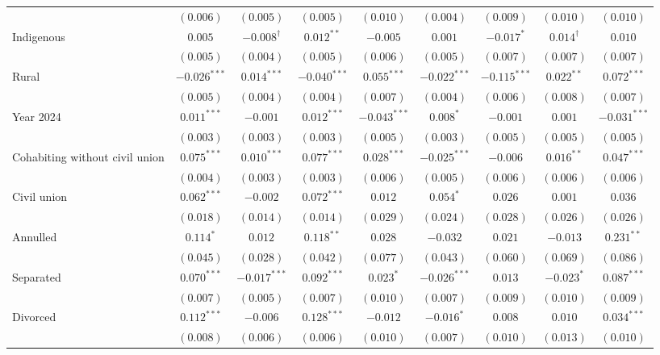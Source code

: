 \begin{table}[htpb]
\begin{adjustbox}{max totalsize={\textwidth}{0.76\textheight},center}
\begin{tabular}{l c c c c c c c c}
 & $(0.006)$ & $(0.005)$ & $(0.005)$ & $(0.010)$ & $(0.004)$ & $(0.009)$ & $(0.010)$ & $(0.010)$ \\
Indigenous & ${0.005}$ & ${-0.008}^{\dagger}$ & ${0.012}^{**}$ & ${-0.005}$ & ${0.001}$ & ${-0.017}^{*}$ & ${0.014}^{\dagger}$ & ${0.010}$ \\
 & $(0.005)$ & $(0.004)$ & $(0.005)$ & $(0.006)$ & $(0.005)$ & $(0.007)$ & $(0.007)$ & $(0.007)$ \\
Rural & ${-0.026}^{***}$ & ${0.014}^{***}$ & ${-0.040}^{***}$ & ${0.055}^{***}$ & ${-0.022}^{***}$ & ${-0.115}^{***}$ & ${0.022}^{**}$ & ${0.072}^{***}$ \\
 & $(0.005)$ & $(0.004)$ & $(0.004)$ & $(0.007)$ & $(0.004)$ & $(0.006)$ & $(0.008)$ & $(0.007)$ \\
Year 2024 & ${0.011}^{***}$ & ${-0.001}$ & ${0.012}^{***}$ & ${-0.043}^{***}$ & ${0.008}^{*}$ & ${-0.001}$ & ${0.001}$ & ${-0.031}^{***}$ \\
 & $(0.003)$ & $(0.003)$ & $(0.003)$ & $(0.005)$ & $(0.003)$ & $(0.005)$ & $(0.005)$ & $(0.005)$ \\
Cohabiting without civil union & ${0.075}^{***}$ & ${0.010}^{***}$ & ${0.077}^{***}$ & ${0.028}^{***}$ & ${-0.025}^{***}$ & ${-0.006}$ & ${0.016}^{**}$ & ${0.047}^{***}$ \\
 & $(0.004)$ & $(0.003)$ & $(0.003)$ & $(0.006)$ & $(0.005)$ & $(0.006)$ & $(0.006)$ & $(0.006)$ \\
Civil union & ${0.062}^{***}$ & ${-0.002}$ & ${0.072}^{***}$ & ${0.012}$ & ${0.054}^{*}$ & ${0.026}$ & ${0.001}$ & ${0.036}$ \\
 & $(0.018)$ & $(0.014)$ & $(0.014)$ & $(0.029)$ & $(0.024)$ & $(0.028)$ & $(0.026)$ & $(0.026)$ \\
Annulled & ${0.114}^{*}$ & ${0.012}$ & ${0.118}^{**}$ & ${0.028}$ & ${-0.032}$ & ${0.021}$ & ${-0.013}$ & ${0.231}^{**}$ \\
 & $(0.045)$ & $(0.028)$ & $(0.042)$ & $(0.077)$ & $(0.043)$ & $(0.060)$ & $(0.069)$ & $(0.086)$ \\
Separated & ${0.070}^{***}$ & ${-0.017}^{***}$ & ${0.092}^{***}$ & ${0.023}^{*}$ & ${-0.026}^{***}$ & ${0.013}$ & ${-0.023}^{*}$ & ${0.087}^{***}$ \\
 & $(0.007)$ & $(0.005)$ & $(0.007)$ & $(0.010)$ & $(0.007)$ & $(0.009)$ & $(0.010)$ & $(0.009)$ \\
Divorced & ${0.112}^{***}$ & ${-0.006}$ & ${0.128}^{***}$ & ${-0.012}$ & ${-0.016}^{*}$ & ${0.008}$ & ${0.010}$ & ${0.034}^{***}$ \\
 & $(0.008)$ & $(0.006)$ & $(0.006)$ & $(0.010)$ & $(0.007)$ & $(0.010)$ & $(0.013)$ & $(0.010)$ \\

\end{tabular}
\end{adjustbox}
\end{table}
